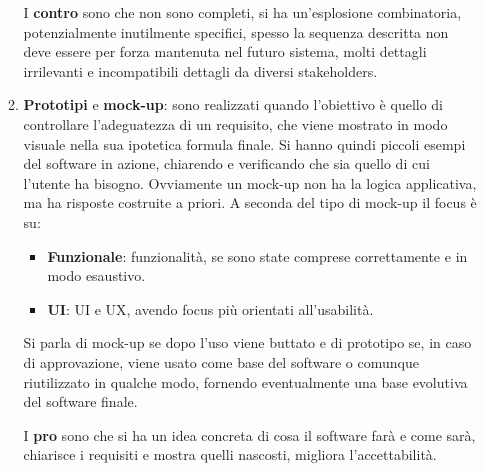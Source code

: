 \begin{itemize}
\begin{enumerate}
                        I \textbf{contro} sono che non sono completi, si ha
                        un'esplosione combinatoria, potenzialmente inutilmente
                        specifici, spesso la sequenza descritta non deve essere
                        per forza mantenuta nel futuro sistema, molti dettagli
                        irrilevanti e incompatibili dettagli da diversi
                        stakeholders.
                  \item \textbf{Prototipi} e \textbf{mock-up}: sono realizzati
                        quando l'obiettivo è quello di controllare l'adeguatezza
                        di un requisito, che viene mostrato in modo visuale nella
                        sua ipotetica formula finale. Si hanno quindi piccoli
                        esempi del software in azione, chiarendo e verificando
                        che sia quello di cui l'utente ha bisogno. Ovviamente un
                        mock-up non ha la logica applicativa, ma ha risposte costruite
                        a priori. A seconda del tipo di mock-up il focus è su:
                        \begin{itemize}
                              \item \textbf{Funzionale}: funzionalità, se sono
                                    state comprese correttamente e in modo
                                    esaustivo.
                              \item \textbf{UI}: UI e UX, avendo focus più
                                    orientati all'usabilità.
                        \end{itemize}
                        Si parla di mock-up se dopo l'uso viene buttato e di
                        prototipo se, in caso di approvazione, viene usato come
                        base del software o comunque riutilizzato in qualche modo,
                        fornendo eventualmente una base evolutiva del software
                        finale.

                        I \textbf{pro} sono che si ha un idea concreta di cosa
                        il software farà e come sarà, chiarisce i requisiti e
                        mostra quelli nascosti, migliora l'accettabilità.


\end{enumerate}
\end{itemize}
